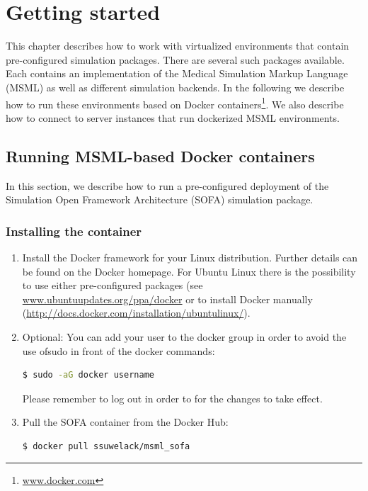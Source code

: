 \chapter{Getting started}                %
This chapter describes how to work with virtualized environments that contain pre-configured simulation packages. There are several such packages available. Each contains an implementation of the Medical Simulation Markup Language (MSML) as well as different simulation backends. In the following we describe how to run these environments based on Docker containers\footnote{\url{www.docker.com} }. We also describe how to connect to server instances that run dockerized MSML environments.   
 
\section{Running MSML-based Docker containers}
In this section, we describe how to run a pre-configured deployment of the Simulation Open Framework Architecture (SOFA) simulation package. 

\subsection{Installing the container}                  %

\begin{enumerate}
	\item Install the Docker framework for your Linux distribution. Further details can be found on the Docker homepage. For Ubuntu Linux there is the possibility to use either pre-configured packages (see \url{www.ubuntuupdates.org/ppa/docker} or to install Docker manually (\url{http://docs.docker.com/installation/ubuntulinux/}).
	\item Optional: You can add your user to the docker group in order to avoid the use ofsudo in front of the docker commands:
		\begin{lstlisting}[language=sh]
  $ sudo -aG docker username
\end{lstlisting}
Please remember to log out in order to for the changes to take effect.
	\item Pull the SOFA container from the Docker Hub: 
	\begin{lstlisting}[language=sh]
  $ docker pull ssuwelack/msml_sofa
\end{lstlisting}
\end{enumerate}

